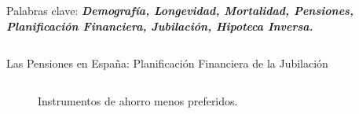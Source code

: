 \documentclass[]{beamer}
\begin{document}
\begin{frame}{\vspace{1ex}\hfill Palabras clave: \bfseries \textit{Demograf\'ia, Longevidad, Mortalidad, Pensiones, Planificaci\'on Financiera, Jubilaci\'on, Hipoteca Inversa.}}
\begin{columns}[t]
\begin{block}{Las Pensiones en Espa\~na: Planificaci\'on Financiera de la Jubilaci\'on}
\begin{columns}[t]
\begin{figure}[h]
						\caption{\small Instrumentos de ahorro menos preferidos.}
						\label{ahorro1}
					\end{figure}
			\end{columns}
		\end{block}
		

\end{columns}
\end{frame}
\end{document}
